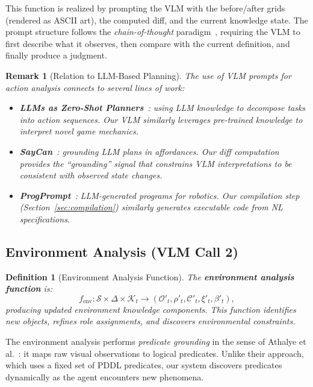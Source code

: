 \documentclass{article}
\newtheorem{definition}{Definition}
\newtheorem{remark}{Remark}
\newcommand{\calS}{\mathcal{S}}
\newcommand{\calO}{\mathcal{O}}
\newcommand{\calC}{\mathcal{C}}
\newcommand{\calK}{\mathcal{K}}
\begin{document}
This function is realized by prompting the VLM with the before/after grids (rendered as ASCII art), the computed diff, and the current knowledge state.  The prompt structure follows the \emph{chain-of-thought} paradigm~\cite{wei2022chain}, requiring the VLM to first describe what it observes, then compare with the current definition, and finally produce a judgment.

\begin{remark}[Relation to LLM-Based Planning]
The use of VLM prompts for action analysis connects to several lines of work:
\begin{itemize}[nosep]
    \item \textbf{LLMs as Zero-Shot Planners}~\cite{huang2022language}: using LLM knowledge to decompose tasks into action sequences.  Our VLM similarly leverages pre-trained knowledge to interpret novel game mechanics.
    \item \textbf{SayCan}~\cite{ahn2022can}: grounding LLM plans in affordances.  Our diff computation provides the ``grounding'' signal that constrains VLM interpretations to be consistent with observed state changes.
    \item \textbf{ProgPrompt}~\cite{singh2023progprompt}: LLM-generated programs for robotics.  Our compilation step (Section~\ref{sec:compilation}) similarly generates executable code from NL specifications.
\end{itemize}
\end{remark}

\subsection{Environment Analysis (VLM Call 2)}
\label{sec:env_analysis}

\begin{definition}[Environment Analysis Function]
\label{def:env_analysis}
The \textbf{environment analysis function} is:
\begin{equation}
f_{\text{env}} : \calS \times \Delta \times \calK_t \longrightarrow (\calO'_t, \rho'_t, \calC'_t, \xi'_t, \beta'_t),
\end{equation}
producing updated environment knowledge components.  This function identifies new objects, refines role assignments, and discovers environmental constraints.
\end{definition}

The environment analysis performs \emph{predicate grounding} in the sense of Athalye et al.~\cite{athalye2024pixels}: it maps raw visual observations to logical predicates.  Unlike their approach, which uses a fixed set of PDDL predicates, our system discovers predicates dynamically as the agent encounters new phenomena.
\end{document}

